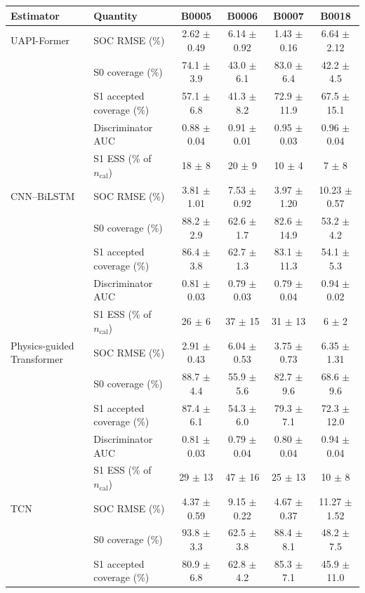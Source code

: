 \begin{tabular}{llcccc}
\toprule
Estimator & Quantity & B0005 & B0006 & B0007 & B0018 \\
\midrule
UAPI-Former & SOC RMSE (\%) & 2.62 $\pm$ 0.49 & 6.14 $\pm$ 0.92 & 1.43 $\pm$ 0.16 & 6.64 $\pm$ 2.12 \\
 & S0 coverage (\%) & 74.1 $\pm$ 3.9 & 43.0 $\pm$ 6.1 & 83.0 $\pm$ 6.4 & 42.2 $\pm$ 4.5 \\
 & S1 accepted coverage (\%) & 57.1 $\pm$ 6.8 & 41.3 $\pm$ 8.2 & 72.9 $\pm$ 11.9 & 67.5 $\pm$ 15.1 \\
 & Discriminator AUC & 0.88 $\pm$ 0.04 & 0.91 $\pm$ 0.01 & 0.95 $\pm$ 0.03 & 0.96 $\pm$ 0.04 \\
 & S1 ESS (\% of $n_{\mathrm{cal}}$) & 18 $\pm$ 8 & 20 $\pm$ 9 & 10 $\pm$ 4 & 7 $\pm$ 8 \\
\addlinespace
CNN--BiLSTM & SOC RMSE (\%) & 3.81 $\pm$ 1.01 & 7.53 $\pm$ 0.92 & 3.97 $\pm$ 1.20 & 10.23 $\pm$ 0.57 \\
 & S0 coverage (\%) & 88.2 $\pm$ 2.9 & 62.6 $\pm$ 1.7 & 82.6 $\pm$ 14.9 & 53.2 $\pm$ 4.2 \\
 & S1 accepted coverage (\%) & 86.4 $\pm$ 3.8 & 62.7 $\pm$ 1.3 & 83.1 $\pm$ 11.3 & 54.1 $\pm$ 5.3 \\
 & Discriminator AUC & 0.81 $\pm$ 0.03 & 0.79 $\pm$ 0.03 & 0.79 $\pm$ 0.04 & 0.94 $\pm$ 0.02 \\
 & S1 ESS (\% of $n_{\mathrm{cal}}$) & 26 $\pm$ 6 & 37 $\pm$ 15 & 31 $\pm$ 13 & 6 $\pm$ 2 \\
\addlinespace
Physics-guided Transformer & SOC RMSE (\%) & 2.91 $\pm$ 0.43 & 6.04 $\pm$ 0.53 & 3.75 $\pm$ 0.73 & 6.35 $\pm$ 1.31 \\
 & S0 coverage (\%) & 88.7 $\pm$ 4.4 & 55.9 $\pm$ 5.6 & 82.7 $\pm$ 9.6 & 68.6 $\pm$ 9.6 \\
 & S1 accepted coverage (\%) & 87.4 $\pm$ 6.1 & 54.3 $\pm$ 6.0 & 79.3 $\pm$ 7.1 & 72.3 $\pm$ 12.0 \\
 & Discriminator AUC & 0.81 $\pm$ 0.03 & 0.79 $\pm$ 0.04 & 0.80 $\pm$ 0.04 & 0.94 $\pm$ 0.04 \\
 & S1 ESS (\% of $n_{\mathrm{cal}}$) & 29 $\pm$ 13 & 47 $\pm$ 16 & 25 $\pm$ 13 & 10 $\pm$ 8 \\
\addlinespace
TCN & SOC RMSE (\%) & 4.37 $\pm$ 0.59 & 9.15 $\pm$ 0.22 & 4.67 $\pm$ 0.37 & 11.27 $\pm$ 1.52 \\
 & S0 coverage (\%) & 93.8 $\pm$ 3.3 & 62.5 $\pm$ 3.8 & 88.4 $\pm$ 8.1 & 48.2 $\pm$ 7.5 \\
 & S1 accepted coverage (\%) & 80.9 $\pm$ 6.8 & 62.8 $\pm$ 4.2 & 85.3 $\pm$ 7.1 & 45.9 $\pm$ 11.0 \\

\end{tabular}
